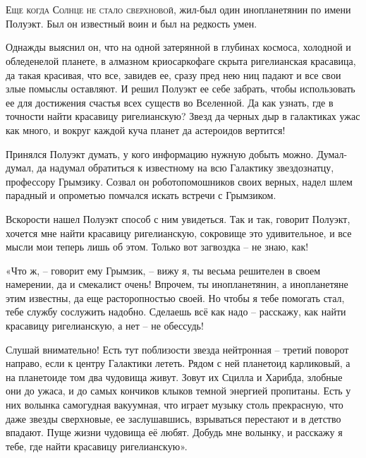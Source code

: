 \documentclass[ebook,oneside,final,openright]{memoir}
\begin{document}
\chapter{}
 \lettrine{Е}{ще когда Солнце не стало сверхновой,} жил-был один инопланетянин по имени Полуэкт. Был он известный воин и был на редкость умен.\par
\par
Однажды выяснил он, что на одной затерянной в глубинах космоса, холодной и обледенелой планете, в алмазном криосаркофаге скрыта ригелианская красавица, да такая красивая, что все, завидев ее, сразу пред нею ниц падают и все свои злые помыслы оставляют. И решил Полуэкт ее себе забрать, чтобы использовать ее для достижения счастья всех существ во Вселенной. Да как узнать, где в точности найти красавицу ригелианскую? Звезд да черных дыр в галактиках ужас как много, и вокруг каждой куча планет да астероидов вертится!\par
\par
Принялся Полуэкт думать, у кого информацию нужную добыть можно. Думал-думал, да надумал обратиться к известному на всю Галактику звездознатцу, профессору Грымзику. Созвал он роботопомошников своих верных, надел шлем парадный и опрометью помчался искать встречи с Грымзиком.\par
\par
Вскорости нашел Полуэкт способ с ним увидеться. Так и так, говорит Полуэкт, хочется мне найти красавицу ригелианскую, сокровище это удивительное, и все мысли мои теперь лишь об этом. Только вот загвоздка – не знаю, как!\par
\par
«Что ж, – говорит ему Грымзик, – вижу я, ты весьма решителен в своем намерении, да и смекалист очень! Впрочем, ты инопланетянин, а инопланетяне этим известны, да еще расторопностью своей. Но чтобы я тебе помогать стал, тебе службу сослужить надобно. Сделаешь всё как надо – расскажу, как найти красавицу ригелианскую, а нет – не обессудь!\par
\par
Слушай внимательно! Есть тут поблизости звезда нейтронная – третий поворот направо, если к центру Галактики лететь. Рядом с ней планетоид карликовый, а на планетоиде том два чудовища живут. Зовут их Сцилла и Харибда, злобные они до ужаса, и до самых кончиков клыков темной энергией пропитаны. Есть у них волынка самогудная вакуумная, что играет музыку столь прекрасную, что даже звезды сверхновые, ее заслушавшись, взрываться перестают и в детство впадают. Пуще жизни чудовища её любят. Добудь мне волынку, и расскажу я тебе, где найти красавицу ригелианскую».\par
\end{document}
